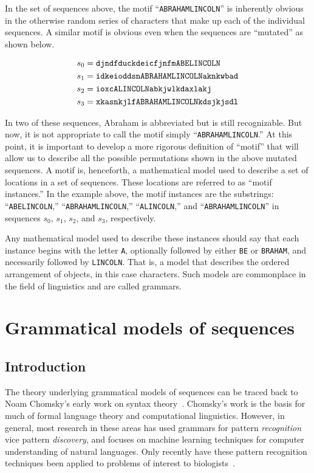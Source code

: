 In the set of sequences above, the motif ``\texttt{ABRAHAMLINCOLN}''
is inherently obvious in the otherwise random series of characters
that make up each of the individual sequences.  A similar motif is
obvious even when the sequences are ``mutated'' as shown below.



\begin{align}\label{eqn:lincoln2}
   s_0 &= \texttt{djndfduckdeicfjnfmABELINCOLN}\\
   s_1 &= \texttt{idkeioddsnABRAHAMLINCOLNaknkwbad}\notag\\
   s_2 &= \texttt{ioxcALINCOLNabkjwlkdaxlakj} \notag\\
   s_3 &= \texttt{xkasnkjlfABRAHAMLINCOLNkdsjkjsdl}\notag
\end{align}

In two of these sequences, Abraham is abbreviated but is still
recognizable.  But now, it is not appropriate to call the motif
simply ``\texttt{ABRAHAMLINCOLN}.''  At this point, it is important
to develop a more rigorous definition of ``motif'' that will allow
us to describe all the possible permutations shown in the above
mutated sequences.  A motif is, henceforth, a mathematical model
used to describe a set of locations in a set of sequences.  These
locations are referred to as ``motif instances.''  In the example
above, the motif instances are the substrings:
``\texttt{ABELINCOLN},'' ``\texttt{ABRAHAMLINCOLN},''
``\texttt{ALINCOLN},'' and ``\texttt{ABRAHAMLINCOLN}'' in sequences
$s_0$, $s_1$, $s_2$, and $s_3$, respectively.

Any mathematical model used to describe these instances should say
that each instance begins with the letter \texttt{A}, optionally
followed by either \texttt{BE} or \texttt{BRAHAM}, and necessarily
followed by \texttt{LINCOLN}.  That is, a model that describes the
ordered arrangement of objects, in this case characters.  Such
models are commonplace in the field of linguistics and are called
grammars.

\section{Grammatical models of sequences}


\subsection*{Introduction}

The theory underlying grammatical models of sequences can be traced
back to Noam Chomsky's early work on syntax
theory~\cite{chomsky1957syntactic,chomsky1965aspects,chomsky1956three}.
 Chomsky's work is the basis for much of formal language theory and
computational linguistics.  However, in general, most research in these
areas has used grammars for pattern \emph{recognition} vice pattern
\emph{discovery}, and focuses on machine learning techniques for
computer understanding of natural languages. Only recently have
these pattern recognition techniques been applied to problems of
interest to
biologists~\cite{searls1997linguistic,searls2001reading,searls1992thecomputational}.

